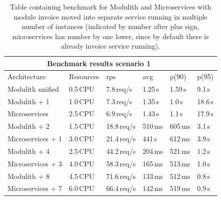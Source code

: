 \begin{table}
    \begin{tabular}{ |p{3cm}||p{3cm}|p{1.5cm}|p{1.5cm}|p{1.5cm}|p{1.5cm}| }
        \hline
        \multicolumn{5}{|c|}{Benchmark results scenario 1}                         \\
        \hline
        Architecture       & Resources & rps         & avg     & p(90)   & p(95)   \\
        \hline
        Modulith unified   & 0.5\,CPU  & 7.8\,req/s  & 1.25\,s & 1.59\,s & 9.1\,s  \\
        \rowcolor{Gray}
        Modulith + 1       & 1.0\,CPU  & 7.3\,req/s  & 1.35\,s & 1.0\,s  & 18.6\,s \\
        \rowcolor{Gray}
        Microservices      & 2.5\,CPU  & 6.9\,req/s  & 1.43\,s & 1.1\,s  & 17.9\,s \\
        Modulith + 2       & 1.5\,CPU  & 18.8\,req/s & 510\,ms & 605\,ms & 3.1\,s  \\
        Microservices  + 1 & 3.0\,CPU  & 21.4\,req/s & 441\,s  & 612\,ms & 3.9\,s  \\
        \rowcolor{Gray}
        Modulith + 4       & 2.5\,CPU  & 44.2\,req/s & 204\,ms & 521\,ms & 1.2\,s  \\
        \rowcolor{Gray}
        Microservices  + 3 & 4.0\,CPU  & 58.3\,req/s & 165\,ms & 513\,ms & 1.0\,s  \\
        Modulith + 8       & 4.5\,CPU  & 71.6\,req/s & 133\,ms & 512\,ms & 0.8\,s  \\
        Microservices  + 7 & 6.0\,CPU  & 66.4\,req/s & 142\,ms & 519\,ms & 0.9\,s  \\
        \hline
    \end{tabular}
    \caption{Table containing benchmark for Modulith and Microservices with module invoice moved into separate service running in multiple number of instances (indicated by number after plus sign, microservices has number by one lower, since by default there is already invoice service running).\label{table:benchmark_modulith_instances}}
\end{table}




% 





